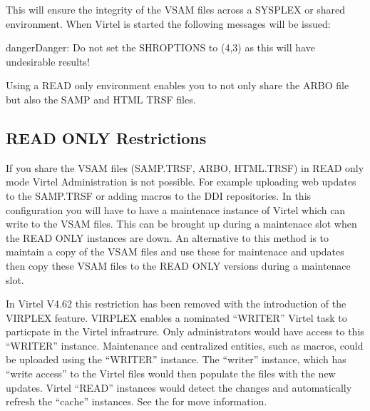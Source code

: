 \documentclass[letterpaper,10pt,english]{sphinxmanual}
\begin{document}
\sphinxAtStartPar
This will ensure the integrity of the VSAM files across a SYSPLEX or shared environment. When Virtel is started the following messages will be issued:\sphinxhyphen{}

\begin{sphinxVerbatim}[commandchars=\\\{\}]
      
   
  
   
   
  
   
  
   
  
  
\end{sphinxVerbatim}

\begin{sphinxadmonition}{danger}{Danger:}
\sphinxAtStartPar
Do not set the SHROPTIONS to (4,3) as this will have undesirable results!
\end{sphinxadmonition}

\sphinxAtStartPar
Using a READ only environment enables you to not only share the ARBO file but also the SAMP and HTML TRSF files.


\subsection{READ ONLY Restrictions}
\label{\detokenize{connectivity_guide:read-only-restrictions}}
\sphinxAtStartPar
If you share the VSAM files (SAMP.TRSF, ARBO, HTML.TRSF) in READ only mode Virtel Administration is not possible. For example uploading web updates to the SAMP.TRSF or adding macros to the DDI repositories. In this configuration you will have to have a maintenace instance of Virtel which can write to the VSAM files. This can be brought up during a maintenace slot when the READ ONLY instances are down. An alternative to this method is to maintain a copy of the VSAM files and use these for maintenace and updates then copy these VSAM files to the READ ONLY versions during a maintenace slot.

\sphinxAtStartPar
In Virtel V4.62 this restriction has been removed with the introduction of the VIRPLEX feature. VIRPLEX enables a nominated “WRITER” Virtel task to particpate in the Virtel infrastrure. Only administrators would have access to this “WRITER” instance. Maintenance and centralized entities, such as macros, could be uploaded using the “WRITER” instance. The “writer” instance, which has “write access” to the Virtel files would then populate the files with the new updates. Virtel “READ” instances would detect the changes and automatically refresh the “cache” instances. See the {\hyperref[\detokenize{connectivity_guide:v462cn-virplex}]{}} for move information.
\end{document}
